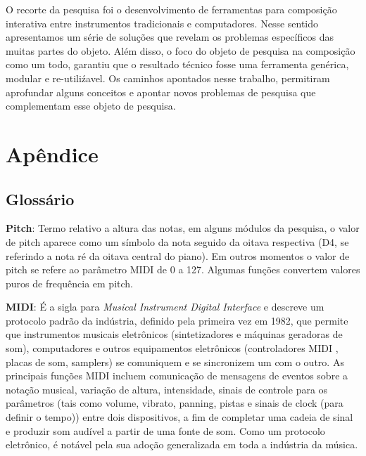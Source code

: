 \documentclass[draft]{ppgmus}
\begin{document}
O recorte da pesquisa foi o desenvolvimento de ferramentas para composição
interativa entre instrumentos tradicionais e computadores. 
Nesse sentido apresentamos um série de soluções que revelam os problemas
específicos das muitas partes do objeto. Além disso, o foco do objeto
de pesquisa na composição como um todo, garantiu que o resultado técnico
fosse uma ferramenta genérica, modular e re-utiliźavel. 
Os caminhos apontados nesse trabalho, permitiram aprofundar alguns conceitos e apontar
novos problemas de pesquisa que complementam esse objeto de pesquisa.

 


\appendix
\chapter{Apêndice}
\label{chap:anexos}


\section{Glossário}
\label{glossario}


\textbf{Pitch}: Termo relativo a altura das notas, em alguns módulos da pesquisa,
o valor de pitch aparece como um símbolo da nota seguido da oitava respectiva (D4, se
referindo a nota ré da oitava central do piano). Em outros momentos o valor de pitch
se refere ao parâmetro MIDI de 0 a 127. Algumas funções convertem valores puros de frequência
em pitch.


\textbf{MIDI}: É a sigla para \textit{Musical Instrument Digital Interface} e descreve um protocolo padrão da indústria, 
definido pela primeira vez em 1982, que permite que instrumentos musicais eletrônicos 
(sintetizadores e máquinas geradoras de som), computadores e outros equipamentos eletrônicos (controladores MIDI , 
placas de som, samplers) se comuniquem e se sincronizem um com o outro. 
As principais funções MIDI incluem comunicação de mensagens de eventos sobre a notação musical,  variação de altura, 
intensidade, sinais de controle para os parâmetros (tais como volume, vibrato, panning, pistas e sinais de 
clock (para definir o tempo)) entre dois dispositivos, a fim de completar uma cadeia de sinal e produzir som 
audível a partir de uma fonte de som. Como um protocolo eletrônico, é notável pela sua adoção generalizada em 
toda a indústria da música.
\end{document}
